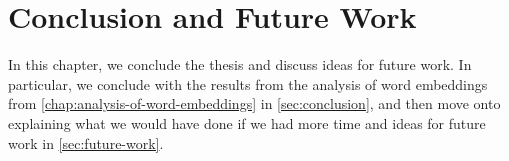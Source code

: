 \chapter{Conclusion and Future Work}
\label{chap:conclusion-and-future-work}
In this chapter, we conclude the thesis and discuss ideas for future work. In particular, we conclude with the results from the analysis of word embeddings from \cref{chap:analysis-of-word-embeddings} in \cref{sec:conclusion}, and then move onto explaining what we would have done if we had more time and ideas for future work in \cref{sec:future-work}.


